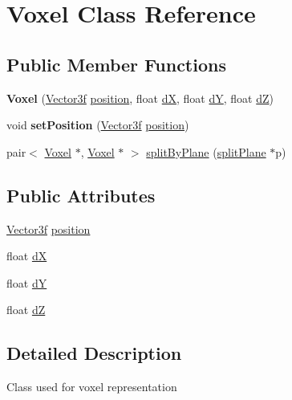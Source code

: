 \hypertarget{class_voxel}{}\section{Voxel Class Reference}
\label{class_voxel}
\subsection*{Public Member Functions}
\begin{DoxyCompactItemize}
\item 
\mbox{\label{class_voxel_a75fa478cf4d24275622e9d954d2bf2c7}} 
{\bfseries Voxel} (\hyperlink{class_vector3f}{Vector3f} \hyperlink{class_voxel_a92eee751b0eaf4d10e4b5aa8f4f749ef}{position}, float \hyperlink{class_voxel_a1e494958e8f6d557a0b9ef65fb445322}{dX}, float \hyperlink{class_voxel_ad7366d4015819afbebd6c5035d694efa}{dY}, float \hyperlink{class_voxel_a58964f88e01b0aed80e993e6aad25f24}{dZ})
\item 
\mbox{\label{class_voxel_afc909b1392d8d211ec35e280eb4bb785}} 
void {\bfseries set\+Position} (\hyperlink{class_vector3f}{Vector3f} \hyperlink{class_voxel_a92eee751b0eaf4d10e4b5aa8f4f749ef}{position})
\item 
pair$<$ \hyperlink{class_voxel}{Voxel} $\ast$, \hyperlink{class_voxel}{Voxel} $\ast$ $>$ \hyperlink{class_voxel_ac205abe6c14926c43c021422eef6a996}{split\+By\+Plane} (\hyperlink{classsplit_plane}{split\+Plane} $\ast$p)
\end{DoxyCompactItemize}
\subsection*{Public Attributes}
\begin{DoxyCompactItemize}
\item 
\hyperlink{class_vector3f}{Vector3f} \hyperlink{class_voxel_a92eee751b0eaf4d10e4b5aa8f4f749ef}{position}
\item 
float \hyperlink{class_voxel_a1e494958e8f6d557a0b9ef65fb445322}{dX}
\item 
float \hyperlink{class_voxel_ad7366d4015819afbebd6c5035d694efa}{dY}
\item 
float \hyperlink{class_voxel_a58964f88e01b0aed80e993e6aad25f24}{dZ}
\end{DoxyCompactItemize}


\subsection{Detailed Description}
Class used for voxel representation 


